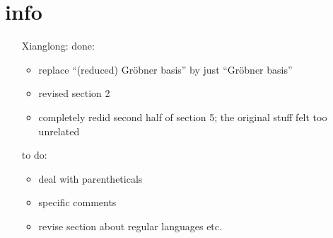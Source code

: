 \section*{info}
\begin{itemize}
	\item[Xianglong:] 
	done:
	\begin{itemize}
		\item replace ``(reduced) Gr\"obner basis'' by just ``Gr\"obner basis''
		\item revised section 2
		\item completely redid second half of section 5; the original stuff felt too unrelated
	\end{itemize}
	to do:
	\begin{itemize}
		\item deal with parentheticals
		\item specific comments
		\item revise section about regular languages etc.
	\end{itemize}
\end{itemize}
\newpage
